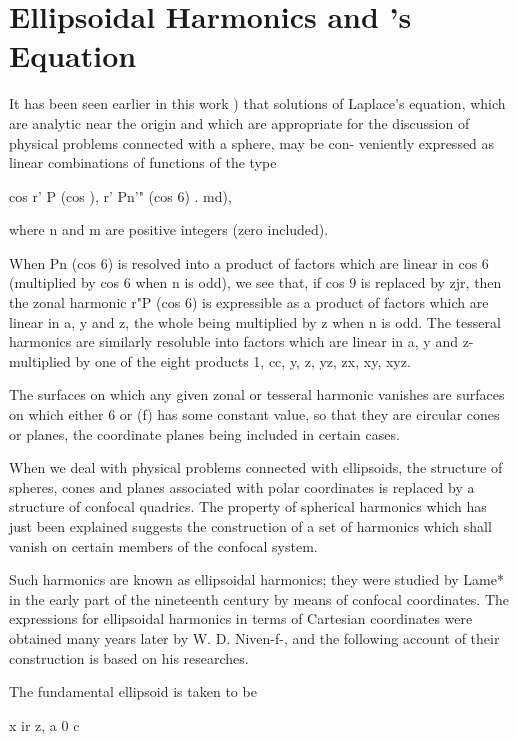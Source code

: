 %
%
\chapter{Ellipsoidal Harmonics and \Lame's Equation}


It has been seen earlier in this work ) that solutions of
Laplace's equation, which are analytic near the origin and which are
appropriate for the discussion of physical problems connected with a
sphere, may be con- veniently expressed as linear combinations of
functions of the type

cos r' P (cos ), r' Pn'" (cos 6) . md),

where n and m are positive integers (zero included).

When Pn (cos 6) is resolved into a product of factors which are linear
in cos 6 (multiplied by cos 6 when n is odd), we see that, if cos 9 is
replaced by zjr, then the zonal harmonic r"P (cos 6) is expressible as
a product of factors which are linear in a, y and z, the whole being
multiplied by z when n is odd. The tesseral harmonics are similarly
resoluble into factors which are linear in a, y and z- multiplied by
one of the eight products 1, cc, y, z, yz, zx, xy, xyz.

The surfaces on which any given zonal or tesseral harmonic vanishes
are surfaces on which either 6 or (f) has some constant value, so that
they are circular cones or planes, the coordinate planes being
included in certain cases.

When we deal with physical problems connected with ellipsoids, the
structure of spheres, cones and planes associated with polar
coordinates is replaced by a structure of confocal quadrics. The
property of spherical harmonics which has just been explained suggests
the construction of a set of harmonics which shall vanish on certain
members of the confocal system.

Such harmonics are known as ellipsoidal harmonics; they were studied
by Lame* in the early part of the nineteenth century by means of
confocal coordinates. The expressions for ellipsoidal harmonics in
terms of Cartesian coordinates were obtained many years later by W. D.
Niven-f-, and the following account of their construction is based on
his researches.

The fundamental ellipsoid is taken to be

x ir z, a 0 c


